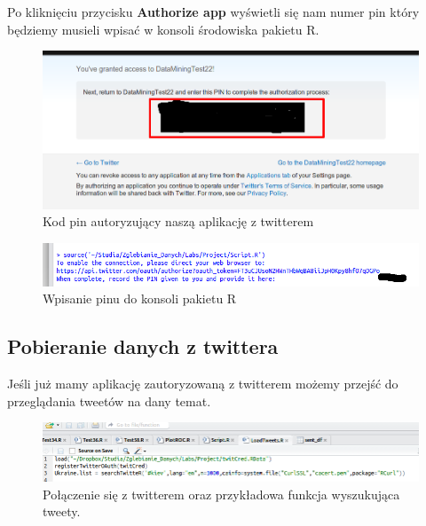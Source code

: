 \documentclass[12pt,a4paper]{article}
\begin{document}
Po kliknięciu przycisku \textbf{Authorize app} wyświetli się nam numer pin który będziemy musieli wpisać w konsoli środowiska pakietu R.
\begin{figure}[H]
\begin{center}
\includegraphics[scale=0.25]{pictures/Twitter6.png}
\caption{Kod pin autoryzujący naszą aplikację z twitterem}
\end{center}
\end{figure}

\begin{figure}[H]
\begin{center}
\includegraphics[scale=0.5]{pictures/Console1.png}
\caption{Wpisanie pinu do konsoli pakietu R}
\end{center}
\end{figure}


\subsection[Pobieranie danych z twittera]{Pobieranie danych z twittera}
Jeśli już mamy aplikację zautoryzowaną z twitterem możemy przejść do przeglądania tweetów na dany temat. 
\begin{figure}[H]
\begin{center}
\includegraphics[scale=0.5]{pictures/Code2.png}
\caption{Połączenie się z twitterem oraz przykładowa funkcja wyszukująca tweety.}
\end{center}
\end{figure}
\end{document}
